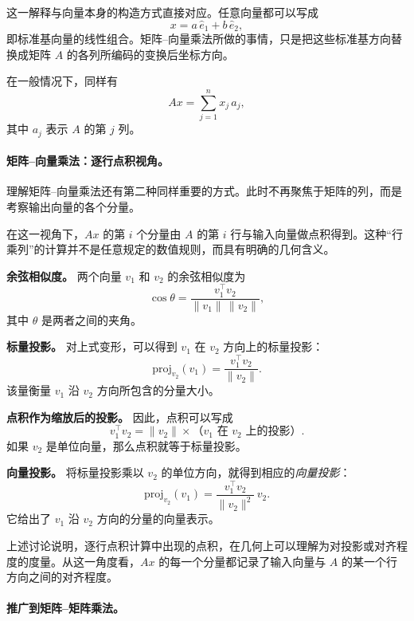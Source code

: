 这一解释与向量本身的构造方式直接对应。任意向量都可以写成
\[
x = a\,\hat{e}_1 + b\,\hat{e}_2,
\]
即标准基向量的线性组合。矩阵--向量乘法所做的事情，只是把这些标准基方向替换成矩阵 \(A\) 的各列所编码的变换后坐标方向。

在一般情况下，同样有
\[
Ax = \sum_{j=1}^n x_j\,a_j,
\]
其中 \(a_j\) 表示 \(A\) 的第 \(j\) 列。

\paragraph{矩阵--向量乘法：逐行点积视角。}

理解矩阵--向量乘法还有第二种同样重要的方式。此时不再聚焦于矩阵的列，而是考察输出向量的各个分量。

在这一视角下，\(Ax\) 的第 \(i\) 个分量由 \(A\) 的第 \(i\) 行与输入向量做点积得到。这种“行乘列”的计算并不是任意规定的数值规则，而具有明确的几何含义。

\begin{tcolorbox}[
  colback=blue!6,
  colframe=blue!55!black,
  title={为什么点积能够编码投影},
  boxrule=0.8pt,
  arc=2mm,
  left=2mm,
  right=2mm,
  top=1mm,
  bottom=1mm
]

\textbf{余弦相似度。}
两个向量 \(v_1\) 和 \(v_2\) 的余弦相似度为
\[
\cos\theta = \frac{v_1^\top v_2}{\|v_1\|\,\|v_2\|},
\]
其中 \(\theta\) 是两者之间的夹角。

\textbf{标量投影。}
对上式变形，可以得到 \(v_1\) 在 \(v_2\) 方向上的标量投影：
\[
\text{proj}_{v_2}(v_1)
=
\frac{v_1^\top v_2}{\|v_2\|}.
\]
该量衡量 \(v_1\) 沿 \(v_2\) 方向所包含的分量大小。

\textbf{点积作为缩放后的投影。}
因此，点积可以写成
\[
v_1^\top v_2
=
\|v_2\| \times \text{（\(v_1\) 在 \(v_2\) 上的投影）}.
\]
如果 \(v_2\) 是单位向量，那么点积就等于标量投影。

\textbf{向量投影。}
将标量投影乘以 \(v_2\) 的单位方向，就得到相应的\emph{向量投影}：
\[
\mathrm{proj}_{v_2}(v_1)
=
\frac{v_1^\top v_2}{\|v_2\|^2}\, v_2.
\]
它给出了 \(v_1\) 沿 \(v_2\) 方向的分量的向量表示。

\end{tcolorbox}
上述讨论说明，逐行点积计算中出现的点积，在几何上可以理解为对投影或对齐程度的度量。从这一角度看，\(Ax\) 的每一个分量都记录了输入向量与 \(A\) 的某一个行方向之间的对齐程度。

\paragraph{推广到矩阵--矩阵乘法。}


